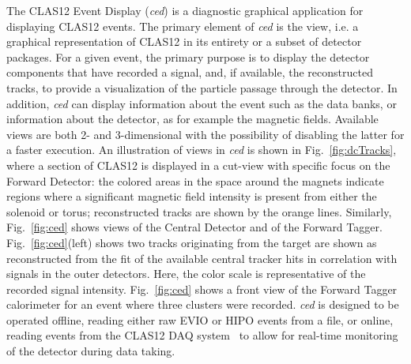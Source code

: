 The CLAS12 Event Display ({\it ced}) is a diagnostic graphical application for displaying CLAS12 events. The
primary element of {\it ced} is the view, i.e. a graphical representation of CLAS12 in its entirety or a subset of
detector packages. For a given event, the primary purpose is to display the detector components that have recorded
a signal, and, if available, the reconstructed tracks, to provide a visualization of the particle passage through the
detector. In addition, {\it ced} can display information about the event such as the data banks, or information about
the detector, as for example the magnetic fields. Available views are both 2- and 3-dimensional with the possibility
of disabling the latter for a faster execution. An illustration of views in {\it ced} is shown in Fig.~\ref{fig:dcTracks},
where a section of CLAS12 is displayed in a cut-view with specific focus on the Forward Detector: the colored areas
in the space around the magnets indicate regions where a significant magnetic field intensity is present from either
the solenoid or torus; reconstructed tracks are shown by the orange lines. Similarly, Fig.~\ref{fig:ced} shows views
of the Central Detector and of the Forward Tagger. Fig.~\ref{fig:ced}(left) shows two tracks originating from the
target are shown as reconstructed from the fit of the available central tracker hits in correlation with signals in the
outer detectors. Here, the color scale is representative of the recorded signal intensity. Fig.~\ref{fig:ced} shows
a front view of the Forward Tagger calorimeter for an event where three clusters were recorded. {\it ced} is designed
to be operated offline, reading either raw EVIO or HIPO events from a file, or online, reading events from the
CLAS12 DAQ system~\cite{daq-nim} to allow for real-time monitoring of the detector during data taking.

